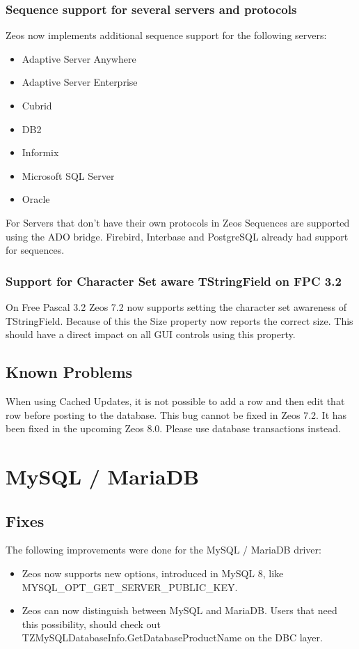 \documentclass[a4paper,12pt,oneside]{book}
\begin{document}
\subsubsection{Sequence support for several servers and protocols}
\label{sec:Rev8_General_Features_Sequences}
Zeos now implements additional sequence support for the following servers:
\begin{itemize}
\item Adaptive Server Anywhere
\item Adaptive Server Enterprise
\item Cubrid
\item DB2
\item Informix
\item Microsoft SQL Server
\item Oracle
\end{itemize}
For Servers that don't have their own protocols in Zeos Sequences are supported using the ADO bridge.
Firebird, Interbase and PostgreSQL already had support for sequences.

\subsubsection{Support for Character Set aware TStringField on FPC 3.2}
\label{sec:Rev8_General_Features_TSTringField}
On Free Pascal 3.2 Zeos 7.2 now supports setting the character set awareness of TStringField.
Because of this the Size property now reports the correct size.
This should have a direct impact on all GUI controls using this property.

\subsection{Known Problems}
When using Cached Updates, it is not possible to add a row and then edit that row before posting to the database.
This bug cannot be fixed in Zeos 7.2.
It has been fixed in the upcoming Zeos 8.0.
Please use database transactions instead.

\section{MySQL / MariaDB}
\subsection{Fixes}
The following improvements were done for the MySQL / MariaDB driver:
\begin{itemize}
\item Zeos now supports new options, introduced in MySQL 8, like MYSQL\_\-OPT\_\-GET\_\-SERVER\_\-PUBLIC\_\-KEY.
\item Zeos can now distinguish between MySQL and MariaDB. Users that need this possibility, should check out TZMySQL\-Database\-Info.\-Get\-Database\-Product\-Name on the DBC layer.
\end{itemize}
\end{document}
